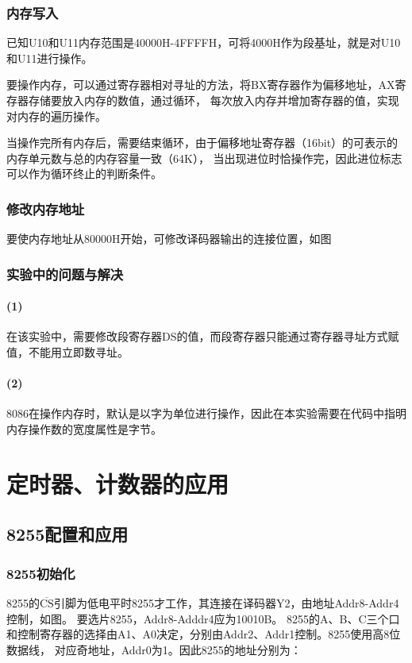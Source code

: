 \documentclass[12pt, a4paper, oneside]{ctexart}
\begin{document}
    \subsubsection{内存写入}
    已知U10和U11内存范围是40000H-4FFFFH，可将4000H作为段基址，就是对U10和U11进行操作。

    要操作内存，可以通过寄存器相对寻址的方法，将BX寄存器作为偏移地址，AX寄存器存储要放入内存的数值，通过循环，
    每次放入内存并增加寄存器的值，实现对内存的遍历操作。

    当操作完所有内存后，需要结束循环，由于偏移地址寄存器（16bit）的可表示的内存单元数与总的内存容量一致（64K），
    当出现进位时恰操作完，因此进位标志可以作为循环终止的判断条件。
    \subsubsection{修改内存地址}
    要使内存地址从80000H开始，可修改译码器输出的连接位置，如图
    \subsubsection{实验中的问题与解决}
    \paragraph{(1)} 在该实验中，需要修改段寄存器DS的值，而段寄存器只能通过寄存器寻址方式赋值，不能用立即数寻址。
    \paragraph{(2)} 8086在操作内存时，默认是以字为单位进行操作，因此在本实验需要在代码中指明内存操作数的宽度属性是字节。
    \section{定时器、计数器的应用}
    \subsection{8255配置和应用}
    \subsubsection{8255初始化}
    8255的$\overline{\text{CS}}$引脚为低电平时8255才工作，其连接在译码器Y2，由地址Addr8-Addr4控制，如图。
    要选片8255，Addr8-Adddr4应为10010B。
    8255的A、B、C三个口和控制寄存器的选择由A1、A0决定，分别由Addr2、Addr1控制。8255使用高8位数据线，
    对应奇地址，Addr0为1。因此8255的地址分别为：
\end{document}

